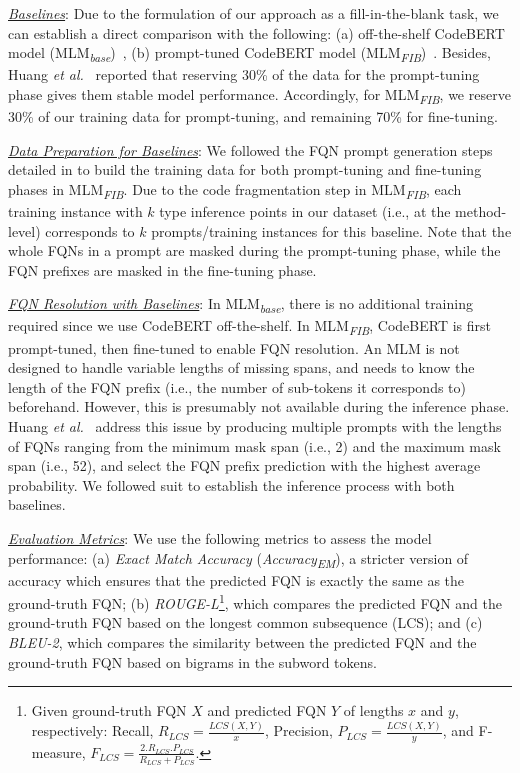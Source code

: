 \noindent\underline{\textit{Baselines}}: Due to the formulation of our approach as a fill-in-the-blank task, we can establish a direct comparison with the following: (a) off-the-shelf CodeBERT model (MLM\textsubscript{\textit{base}})~\cite{codebert}, (b) prompt-tuned CodeBERT model (MLM\textsubscript{\textit{FIB}})~\cite{prompt-ase22}. Besides, Huang {\em et al.}~\cite{prompt-ase22} reported that reserving 30\% of the data for the prompt-tuning phase gives them stable model performance. Accordingly, for MLM\textsubscript{\textit{FIB}}, we reserve 30\% of our training data for prompt-tuning, and remaining 70\% for fine-tuning.

\noindent\underline{\textit{Data Preparation for Baselines}}: We followed the FQN prompt generation steps detailed in \cite{prompt-ase22} to build the training data for both prompt-tuning and fine-tuning phases in MLM\textsubscript{\textit{FIB}}. Due to the code fragmentation step in MLM\textsubscript{\textit{FIB}}, each training instance with $k$ type inference points in our dataset (i.e., at the method-level) corresponds to $k$ prompts/training instances for this baseline. Note that the whole FQNs in a prompt are masked during the prompt-tuning phase, while the FQN prefixes are masked in the fine-tuning phase.

\noindent\underline{\textit{FQN Resolution with Baselines}}: In MLM\textsubscript{\textit{base}}, there is no additional training required since we use CodeBERT off-the-shelf. In MLM\textsubscript{\textit{FIB}}, CodeBERT is first prompt-tuned, then fine-tuned to enable FQN resolution. An MLM is not designed to handle variable lengths of missing spans, and needs to know the length of the FQN prefix (i.e., the number of sub-tokens it corresponds to) beforehand. However, this is presumably not available during the inference phase. Huang {\em et al.}~\cite{prompt-ase22} address this issue by producing multiple prompts with the lengths of FQNs ranging from the minimum mask span (i.e., 2) and the maximum mask span (i.e., 52), and select the FQN prefix prediction with the highest average probability. We followed suit to establish the inference process with both baselines.

\noindent\underline{\textit{Evaluation Metrics}}: We use the following metrics to assess the model performance: (a) \textit{Exact Match Accuracy} ({\em Accuracy\textsubscript{EM}}), a stricter version of accuracy which ensures that the predicted FQN is exactly the same as the ground-truth FQN; (b) \textit{ROUGE-L}\footnote{Given ground-truth FQN $X$ and predicted FQN $Y$ of lengths $x$ and $y$, respectively: Recall, $R_{LCS}=\frac{LCS(X, Y)}{x}$, Precision, $P_{LCS}=\frac{LCS(X, Y)}{y}$, and F-measure, $F_{LCS}=\frac{2.R_{LCS}.P_{LCS}}{R_{LCS}+P_{LCS}}$.}, which compares the predicted FQN and the ground-truth FQN based on the longest common subsequence (LCS); and (c) \textit{BLEU-2}, which compares the similarity between the predicted FQN and the ground-truth FQN based on bigrams in the subword tokens.


